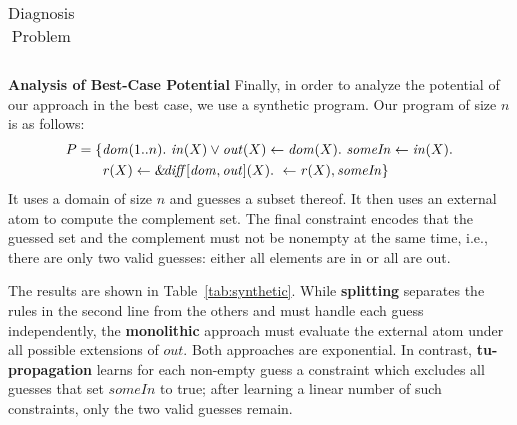 \documentclass[11pt,fleqn,twoside]{article}
\newcommand{\leanparagraph}[1]{\smallskip\noindent\textbf{#1}}
\newcommand{\amp}[1]{\ensuremath{\text{\textsl{{\&}}}\!\mathit{#1}}}
\newcommand{\ext}[3]{\ensuremath{\amp{#1}[#2](#3)}}
\begin{document}
{\begin{table}[t]
\begin{tabular}[t]{|r|r|r|r|r|r|r|r|r|r|r|r|r|r|r|}
					\hline
				\end{tabular}
				\caption{Diagnosis Problem}
				\label{tab:diagnosis}
			\end{table}
}

			\leanparagraph{Analysis of Best-Case Potential}
			Finally, in order to analyze the potential of our approach in the best case, we use a synthetic program.
			Our program of size $n$ is as follows:
			\begin{align*}
				P = \{	& \mathit{dom}(1..n). \ \mathit{in}(X) \vee \mathit{out}(X) \leftarrow \mathit{dom}(X). \ \mathit{someIn} \leftarrow \mathit{in}(X). \\
						& \mathit{r}(X) \leftarrow \ext{\mathit{diff}}{\mathit{dom}, \mathit{out}}{X}. \ \leftarrow \mathit{r}(X), \mathit{someIn} \}
			\end{align*}
			It uses a domain of size $n$ and guesses a subset thereof. It then uses an external atom to compute the complement set.
			The final constraint encodes that the guessed set and the complement must not be nonempty at the same time, i.e.,
			there are only two valid guesses: either all elements are in or all are out.
			
			The results are shown in Table~\ref{tab:synthetic}.
			While \textbf{splitting} separates the rules in the second line from the others and must handle each guess independently,
			the \textbf{monolithic} approach must evaluate the external atom under all possible extensions of $\mathit{out}$.
			Both approaches are exponential.
			In contrast, \textbf{tu-propagation} learns for each non-empty guess a constraint which excludes all guesses that set $\mathit{someIn}$ to true;
			after learning a linear number of such constraints, only the two valid guesses remain. %
\end{document}

